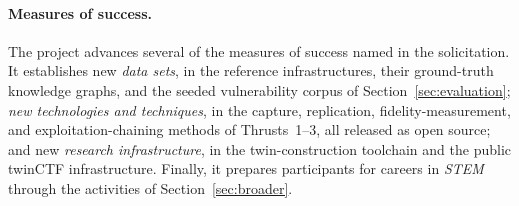 \paragraph{Measures of success.}
The project advances several of the measures of success named in the
solicitation. It establishes new \emph{data sets}, in the reference
infrastructures, their ground-truth knowledge graphs, and the seeded
vulnerability corpus of Section~\ref{sec:evaluation}; \emph{new technologies
and techniques}, in the capture, replication, fidelity-measurement, and
exploitation-chaining methods of Thrusts~1--3, all released as open source;
and new \emph{research infrastructure}, in the twin-construction toolchain
and the public twinCTF infrastructure. Finally, it prepares participants for
careers in \emph{STEM} through the activities of
Section~\ref{sec:broader}.
